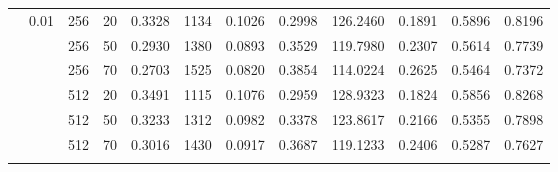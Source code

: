 \begin{table}[H]
{\begin{tabular}{llllrrrrrrrr}
	& \multirow{6}{*}{0.01} & 256 & 20 & {\cellcolor[HTML]{7E7EF9}} \color[HTML]{F1F1F1} 0.3328 & {\cellcolor[HTML]{6262FA}} \color[HTML]{F1F1F1} 1134 & {\cellcolor[HTML]{7171F9}} \color[HTML]{F1F1F1} 0.1026 & {\cellcolor[HTML]{5D5DFA}} \color[HTML]{F1F1F1} 0.2998 & {\cellcolor[HTML]{B4B4F6}} \color[HTML]{000000} 126.2460 & {\cellcolor[HTML]{6161FA}} \color[HTML]{F1F1F1} 0.1891 & {\cellcolor[HTML]{C4C4F5}} \color[HTML]{000000} 0.5896 & {\cellcolor[HTML]{8989F8}} \color[HTML]{F1F1F1} 0.8196 \\ & & 256 & 50 & {\cellcolor[HTML]{C7C7F5}} \color[HTML]{000000} 0.2930 & {\cellcolor[HTML]{2424FD}} \color[HTML]{F1F1F1} 1380 & {\cellcolor[HTML]{C4C4F5}} \color[HTML]{000000} 0.0893 & {\cellcolor[HTML]{2323FD}} \color[HTML]{F1F1F1} 0.3529 & {\cellcolor[HTML]{D4D4F4}} \color[HTML]{000000} 119.7980 & {\cellcolor[HTML]{2929FD}} \color[HTML]{F1F1F1} 0.2307 & {\cellcolor[HTML]{D9D9F4}} \color[HTML]{000000} 0.5614 & {\cellcolor[HTML]{C2C2F5}} \color[HTML]{000000} 0.7739 \\ & & 256 & 70 & {\cellcolor[HTML]{F0F0F3}} \color[HTML]{000000} 0.2703 & {\cellcolor[HTML]{0000FF}} \color[HTML]{F1F1F1} 1525 & {\cellcolor[HTML]{F0F0F3}} \color[HTML]{000000} 0.0820 & {\cellcolor[HTML]{0000FF}} \color[HTML]{F1F1F1} 0.3854 & {\cellcolor[HTML]{F0F0F3}} \color[HTML]{000000} 114.0224 & {\cellcolor[HTML]{0000FF}} \color[HTML]{F1F1F1} 0.2625 & {\cellcolor[HTML]{E4E4F3}} \color[HTML]{000000} 0.5464 & {\cellcolor[HTML]{F0F0F3}} \color[HTML]{000000} 0.7372 \\ & & 512 & 20 & {\cellcolor[HTML]{6060FA}} \color[HTML]{F1F1F1} 0.3491 & {\cellcolor[HTML]{6767FA}} \color[HTML]{F1F1F1} 1115 & {\cellcolor[HTML]{5252FB}} \color[HTML]{F1F1F1} 0.1076 & {\cellcolor[HTML]{6161FA}} \color[HTML]{F1F1F1} 0.2959 & {\cellcolor[HTML]{A7A7F7}} \color[HTML]{000000} 128.9323 & {\cellcolor[HTML]{6B6BFA}} \color[HTML]{F1F1F1} 0.1824 & {\cellcolor[HTML]{C7C7F5}} \color[HTML]{000000} 0.5856 & {\cellcolor[HTML]{7F7FF9}} \color[HTML]{F1F1F1} 0.8268 \\ & & 512 & 50 & {\cellcolor[HTML]{8F8FF8}} \color[HTML]{F1F1F1} 0.3233 & {\cellcolor[HTML]{3636FC}} \color[HTML]{F1F1F1} 1312 & {\cellcolor[HTML]{8C8CF8}} \color[HTML]{F1F1F1} 0.0982 & {\cellcolor[HTML]{3434FC}} \color[HTML]{F1F1F1} 0.3378 & {\cellcolor[HTML]{C0C0F5}} \color[HTML]{000000} 123.8617 & {\cellcolor[HTML]{3C3CFC}} \color[HTML]{F1F1F1} 0.2166 & {\cellcolor[HTML]{ECECF3}} \color[HTML]{000000} 0.5355 & {\cellcolor[HTML]{AEAEF6}} \color[HTML]{000000} 0.7898 \\ & & 512 & 70 & {\cellcolor[HTML]{B7B7F6}} \color[HTML]{000000} 0.3016 & {\cellcolor[HTML]{1818FE}} \color[HTML]{F1F1F1} 1430 & {\cellcolor[HTML]{B5B5F6}} \color[HTML]{000000} 0.0917 & {\cellcolor[HTML]{1212FE}} \color[HTML]{F1F1F1} 0.3687 & {\cellcolor[HTML]{D8D8F4}} \color[HTML]{000000} 119.1233 & {\cellcolor[HTML]{1C1CFE}} \color[HTML]{F1F1F1} 0.2406 & {\cellcolor[HTML]{F0F0F3}} \color[HTML]{000000} 0.5287 & {\cellcolor[HTML]{D0D0F4}} \color[HTML]{000000} 0.7627 \\ \hlineB{5.5}

\end{tabular}}
\end{table}
